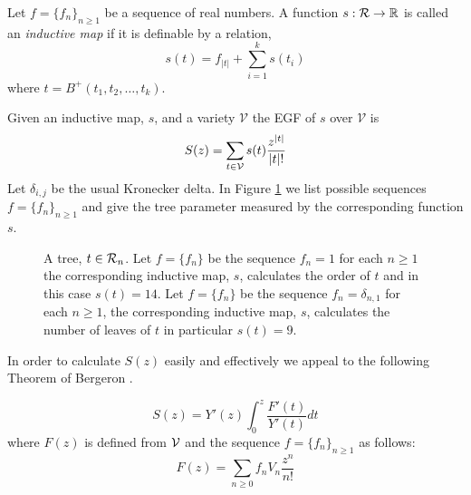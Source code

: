 \begin{defn}
Let $f = \{f_n\}_{n\geq 1}$ be a sequence of real numbers.  A function $s: \operatorname{\mathcal{R}} \rightarrow \mathbb{R}$ is called an 
\emph{inductive map} if it is definable by a relation,
\[
 s(t) = f_{\lvert t \rvert} + \sum_{i=1}^k s(t_i)
\]
where $t = B^{+}(t_1,t_2,\dots,t_k)$.
\end{defn}
Given an inductive map, $s$, and a variety $\mathcal{V}$ the EGF of $s$ over $\mathcal{V}$ is 
\[
 S(z) = \sum_{t \in \operatorname{\mathcal{V}}} s(t) \frac{z^{\lvert t \rvert}}{\lvert t \rvert !}
\]
Let $\delta_{i,j}$ be the usual Kronecker delta. In Figure \ref{fig:3} we list possible sequences $f = \{f_n\}_{n \geq 1}$ and give the tree parameter 
 measured by the corresponding function $s$.
\begin{figure}[H]
\centering
{}
\caption{A tree, $t \in \operatorname{\mathcal{R}}_n$.  Let $f = \{f_n\}$  be the sequence $f_n = 1$ for each $n \geq 1$ the corresponding inductive map, $s$, calculates the order
 of $t$ and in this case $s(t) = 14$.  Let 
$f = \{f_n\}$  be the sequence $f_n = \delta_{n,1}$ for each $n \geq 1$, the corresponding inductive map, $s$,  calculates the number of leaves of $t$ in particular 
$s(t) = 9$.}\label{fig:3}
\end{figure} 

In order to calculate $S(z)$ easily and effectively we appeal to the following Theorem of Bergeron \cite{bergeron}.
\begin{thm}\label{thm:inductivemaps}
 \[
 S(z) = Y'(z) \int_{0}^{z} \frac{F'(t)}{Y'(t)} dt
 \]
where $F(z)$ is defined from $\operatorname{\mathcal{V}}$ and the sequence $f = \{f_n\}_{n \geq 1}$ as follows:
\[
 F(z) = \sum_{n \geq 0} f_n V_n \frac{z^n}{n!}
\]
\end{thm}

